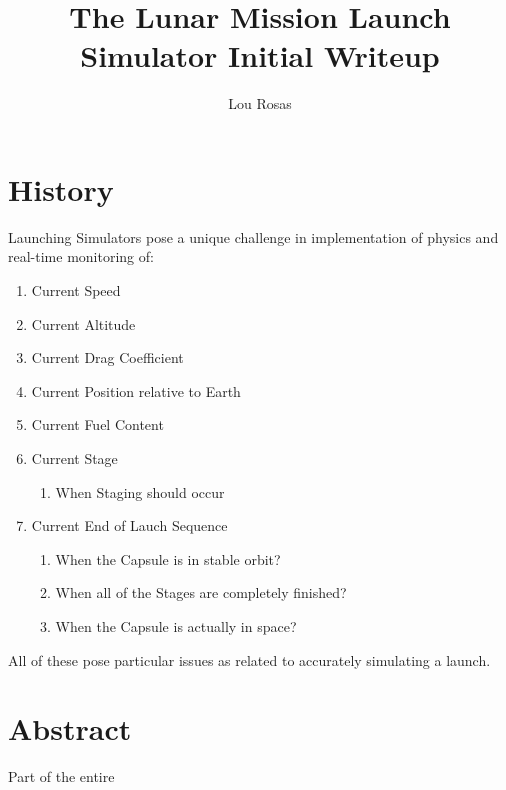 \documentclass[letterpaper]{article}
\begin{document}
\title{The Lunar Mission Launch Simulator Initial Writeup}
\author{Lou Rosas}
\maketitle

\section{History}
Launching Simulators pose a unique challenge in implementation of
physics and real-time monitoring of:
\begin{enumerate}
\item Current Speed
\item Current Altitude
\item Current Drag Coefficient
\item Current Position relative to Earth
\item Current Fuel Content
\item Current Stage
\begin{enumerate}
\item When Staging should occur
\end{enumerate}
\item Current End of Lauch Sequence
\begin{enumerate}
\item When the Capsule is in stable orbit?
\item When all of the Stages are completely finished?
\item When the Capsule is actually in space?
\end{enumerate}
\end{enumerate}
All of these pose particular issues as related to accurately
simulating a launch.
\section{Abstract}
Part of the entire
\end{document}
